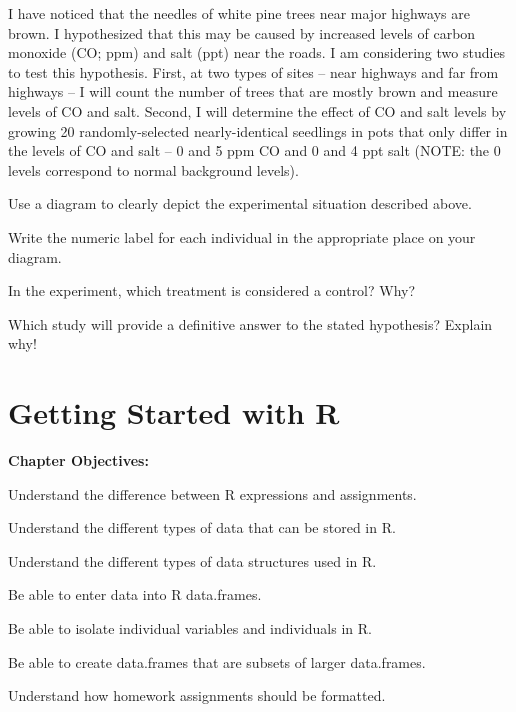 \documentclass[10pt,openany]{book}\usepackage[]{graphicx}\usepackage[]{color}
\begin{document}
\begin{exsection}
  \item \label{revex:ExpDPine} I have noticed that the needles of white pine trees near major highways are brown.  I hypothesized that this may be caused by increased levels of carbon monoxide (CO; ppm) and salt (ppt) near the roads.  I am considering two studies to test this hypothesis.  First, at two types of sites -- near highways and far from highways -- I will count the number of trees that are mostly brown and measure levels of CO and salt.  Second, I will determine the effect of CO and salt levels by growing 20 randomly-selected nearly-identical seedlings in pots that only differ in the levels of CO and salt -- 0 and 5 ppm CO and 0 and 4 ppt salt (NOTE: the 0 levels correspond to normal background levels). 
\begin{Enumerate}
  \item Use a diagram to clearly depict the experimental situation described above.
  \item \rhw{} Write the numeric label for each individual in the appropriate place on your diagram.
  \item In the experiment, which treatment is considered a control?  Why?
  \item Which study will provide a definitive answer to the stated hypothesis?  Explain why!
\end{Enumerate}

\end{exsection}



\chapter{Getting Started with R} \label{chap:FoundationsR}
\begin{ChapObj}{\boxwidth}
  \textbf{Chapter Objectives:}
  \begin{Enumerate}
    \item Understand the difference between R expressions and assignments.
    \item Understand the different types of data that can be stored in R.
    \item Understand the different types of data structures used in R.
    \item Be able to enter data into R data.frames.
    \item Be able to isolate individual variables and individuals in R.
    \item Be able to create data.frames that are subsets of larger data.frames.
    \item Understand how homework assignments should be formatted.
  \end{Enumerate}
\end{ChapObj}
\end{document}
